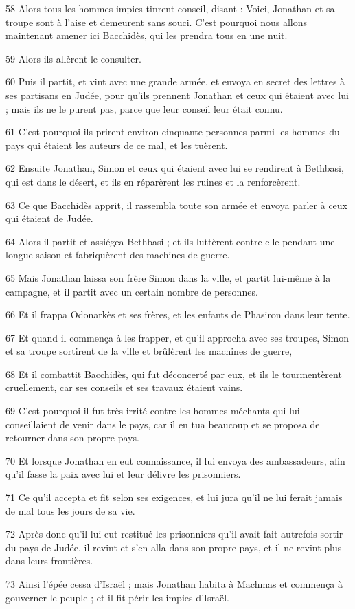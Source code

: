 \par 58 Alors tous les hommes impies tinrent conseil, disant : Voici, Jonathan et sa troupe sont à l'aise et demeurent sans souci. C'est pourquoi nous allons maintenant amener ici Bacchidès, qui les prendra tous en une nuit.
\par 59 Alors ils allèrent le consulter.
\par 60 Puis il partit, et vint avec une grande armée, et envoya en secret des lettres à ses partisans en Judée, pour qu'ils prennent Jonathan et ceux qui étaient avec lui ; mais ils ne le purent pas, parce que leur conseil leur était connu.
\par 61 C'est pourquoi ils prirent environ cinquante personnes parmi les hommes du pays qui étaient les auteurs de ce mal, et les tuèrent.
\par 62 Ensuite Jonathan, Simon et ceux qui étaient avec lui se rendirent à Bethbasi, qui est dans le désert, et ils en réparèrent les ruines et la renforcèrent.
\par 63 Ce que Bacchidès apprit, il rassembla toute son armée et envoya parler à ceux qui étaient de Judée.
\par 64 Alors il partit et assiégea Bethbasi ; et ils luttèrent contre elle pendant une longue saison et fabriquèrent des machines de guerre.
\par 65 Mais Jonathan laissa son frère Simon dans la ville, et partit lui-même à la campagne, et il partit avec un certain nombre de personnes.
\par 66 Et il frappa Odonarkès et ses frères, et les enfants de Phasiron dans leur tente.
\par 67 Et quand il commença à les frapper, et qu'il approcha avec ses troupes, Simon et sa troupe sortirent de la ville et brûlèrent les machines de guerre,
\par 68 Et il combattit Bacchidès, qui fut déconcerté par eux, et ils le tourmentèrent cruellement, car ses conseils et ses travaux étaient vains.
\par 69 C'est pourquoi il fut très irrité contre les hommes méchants qui lui conseillaient de venir dans le pays, car il en tua beaucoup et se proposa de retourner dans son propre pays.
\par 70 Et lorsque Jonathan en eut connaissance, il lui envoya des ambassadeurs, afin qu'il fasse la paix avec lui et leur délivre les prisonniers.
\par 71 Ce qu'il accepta et fit selon ses exigences, et lui jura qu'il ne lui ferait jamais de mal tous les jours de sa vie.
\par 72 Après donc qu'il lui eut restitué les prisonniers qu'il avait fait autrefois sortir du pays de Judée, il revint et s'en alla dans son propre pays, et il ne revint plus dans leurs frontières.
\par 73 Ainsi l'épée cessa d'Israël ; mais Jonathan habita à Machmas et commença à gouverner le peuple ; et il fit périr les impies d'Israël.

